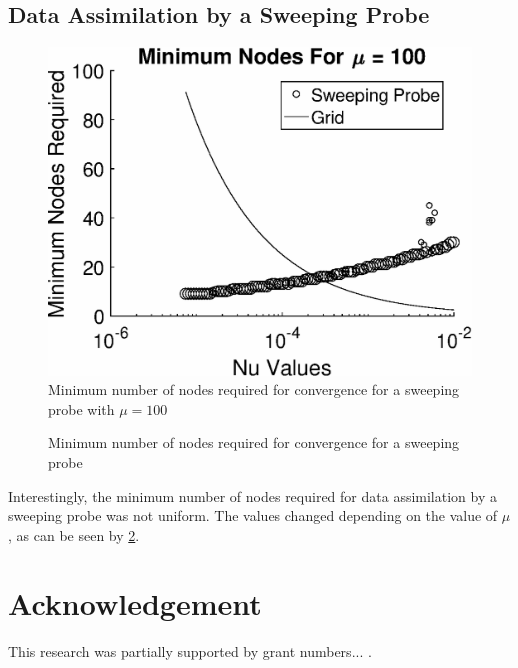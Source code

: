 \documentclass[12pt]{amsart}
\theoremstyle{plain}
\theoremstyle{definition}
\theoremstyle{remark}
\numberwithin{equation}{section} %
\numberwithin{figure}{section}   %
\begin{document}
\subsection*{Data Assimilation by a Sweeping Probe}
\begin{figure}
	\centering
	\includegraphics[width = .9\textwidth]{DA_MinimunNodes_Car_mu=100}
	\caption{Minimum number of nodes required for convergence for a sweeping probe with $\mu = 100$}
	\label{fig:minimumcar}
\end{figure}
\begin{figure}
	\centering
{}
\caption{Minimum number of nodes required for convergence for a sweeping probe}
\label{minimumcar_allmu}
\end{figure}
Interestingly, the minimum number of nodes required for data assimilation by a sweeping probe was not uniform. The values changed depending on the value of $\mu$, as can be seen by \ref{minimumcar_allmu}.
 \section*{Acknowledgement}
 \noindent
 This research was partially supported by grant numbers... .
 
\begin{scriptsize}
%

\end{scriptsize}


\end{document}
